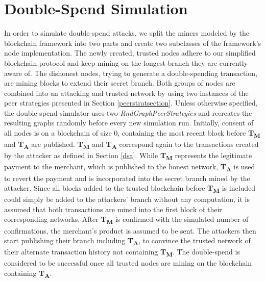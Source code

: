 \documentclass[a4paper,12pt,twoside]{report}
\begin{document}
\section{Double-Spend Simulation} \label{dssim}
In order to simulate double-spend attacks, we split the miners modeled by the blockchain framework into two parts and create two subclasses of the framework's node implementation. The newly created, trusted nodes adhere to our simplified blockchain protocol and keep mining on the longest branch they are currently aware of. The dishonest nodes, trying to generate a double-spending transaction, are mining blocks to extend their secret branch. Both groups of nodes are combined into an attacking and trusted network by using two instances of the peer strategies presented in Section \ref{peerstratsection}. Unless otherwise specified, the double-spend simulator uses two \textit{RndGraphPeerStrategies} and recreates the resulting graphs randomly before every new simulation run. Initially, consent of all nodes is on a blockchain of size 0, containing the most recent block before \textbf{T\textsubscript{M}} and \textbf{T\textsubscript{A}} are published. \textbf{T\textsubscript{M}} and \textbf{T\textsubscript{A}} correspond again to the transactions created by the attacker as defined in Section \ref{dsa}. While \textbf{T\textsubscript{M}} represents the legitimate payment to the merchant, which is published to the honest network, \textbf{T\textsubscript{A}} is used to revert the payment and is incorporated into the secret branch mined by the attacker. Since all blocks added to the trusted blockchain before \textbf{T\textsubscript{M}} is included could simply be added to the attackers' branch without any computation, it is assumed that both transactions are mined into the first block of their corresponding networks. After \textbf{T\textsubscript{M}} is confirmed with the simulated number of confirmations, the merchant's product is assumed to be sent. The attackers then start publishing their branch including \textbf{T\textsubscript{A}}, to convince the trusted network of their alternate transaction history not containing \textbf{T\textsubscript{M}}. The double-spend is considered to be successful once all trusted nodes are mining on the blockchain containing \textbf{T\textsubscript{A}}.
\end{document}
